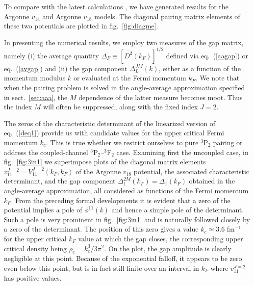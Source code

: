 To compare with the latest calculations \cite{catoslo}, we have 
generated results for the Argonne $v_{14}$ and Argonne $v_{18}$ models.
The diagonal pairing matrix elements of these two potentials 
are plotted in fig.~\ref{fig:diagme}.  

In presenting the numerical results, we employ two measures of
the gap matrix, namely (i) the average quantity $\Delta_F \equiv 
\left[{\overline{D^2}}(k_F)\right]^{1/2}$ defined via eq.~(\ref{aagap})
or eq.~(\ref{avgap}) and (ii) the gap component $\Delta_L^{JM}(k)$, 
either as a function of the momentum modulus $k$ or evaluated at the 
Fermi momentum $k_F$.  We note that when the pairing problem is solved 
in the angle-average approximation specified in sect.~\ref{sec:aaa}, 
the $M$ dependence of the latter measure becomes moot.  Thus the
index $M$ will often be suppressed, along with the fixed index
$J=2$.

The zeros of the characteristic determinant of the linearized version
of eq.~(\ref{deq1}) provide us with candidate values for the upper 
critical Fermi momentum $k_c$.  This is true whether we restrict 
ourselves to pure $^3$P$_2$ pairing or address the coupled-channel
$^3$P$_2$--$^3$F$_2$ case.   Examining first the uncoupled case, 
in fig.~\ref{fig:3in1} we superimpose plots of the diagonal matrix
elements $v_{11}^{J=2}= V_{11}^{J=2}(k_F,k_F)$ of the Argonne $v_{18}$
potential, the associated characteristic determinant, and the gap 
component $\Delta_1^{2M}(k_F)=\Delta_1(k_F)$ obtained in the 
angle-average approximation, all considered as functions of the Fermi 
momentum $k_F$.  From the preceding formal developments it is 
evident that a zero of the potential implies a pole of $\phi^{11}(k)$ 
and hence a simple pole of the determinant.  Such a pole is very prominent 
in fig.~\ref{fig:3in1} and is naturally followed closely by a zero of the 
determinant.  The position of this zero gives a value 
$k_c \simeq 3.6$ fm$^{-1}$ for the upper critical $k_F$ value at 
which the gap closes, the corresponding upper critical density being 
$\rho_c= k_c^3/3 \pi^2$.  On the plot, the gap amplitude 
is clearly negligible at this point.  Because of the exponential 
falloff, it appears to be zero even below this point, but is in 
fact still finite over an interval in $k_F$ where $v^{J=2}_{11}$ has 
positive values.

